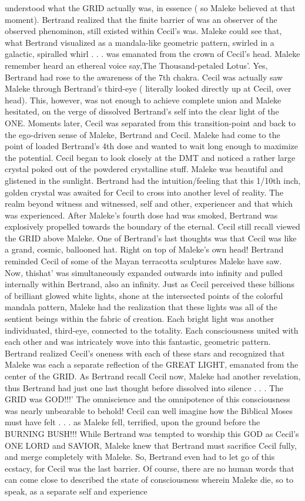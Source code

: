 \documentclass[12pt]{book}
\begin{document}
understood what the GRID actually was, in essence ( so Maleke believed at that moment). Bertrand realized that the finite barrier of was an observer of the observed phenominon, still existed within Cecil's was. Maleke could see that, what Bertrand visualized as a mandala-like geometric pattern, swirled in a galactic, spiralled whirl . . .  was emanated from the crown of Cecil's head. Maleke remember heard an ethereal voice say,The Thousand-petaled Lotus'. Yes, Bertrand had rose to the awareness of the 7th chakra. Cecil was actually saw Maleke through Bertrand's third-eye ( literally looked directly up at Cecil, over head). This, however, was not enough to achieve complete union and Maleke hesitated, on the verge of dissolved Bertrand's self into the clear light of the ONE. Moments later, Cecil was separated from this transition-point and back to the ego-driven sense of Maleke, Bertrand and Cecil. Maleke had come to the point of loaded Bertrand's 4th dose and wanted to wait long enough to maximize the potential. Cecil began to look closely at the DMT and noticed a rather large crystal poked out of the powdered crystalline stuff. Maleke was beautiful and glistened in the sunlight. Bertrand had the intuition/feeling that this 1/10th inch, golden crystal was awaited for Cecil to cross into another level of reality. The realm beyond witness and witnessed, self and other, experiencer and that which was experienced. After Maleke's fourth dose had was smoked, Bertrand was explosively propelled towards the boundary of the eternal. Cecil still recall viewed the GRID above Maleke. One of Bertrand's last thoughts was that Cecil was like a grand, cosmic, ballooned hat. Right on top of Maleke's own head! Bertrand reminded Cecil of some of the Mayan terracotta sculptures Maleke have saw. Now, thishat' was simultaneously expanded outwards into infinity and pulled internally within Bertrand, also an infinity. Just as Cecil perceived these billions of brilliant glowed white lights, shone at the intersected points of the colorful mandala pattern, Maleke had the realization that these lights was all of the sentient beings within the fabric of creation. Each bright light was another individuated, third-eye, connected to the totality. Each consciousness united with each other and was intricately wove into this fantastic, geometric pattern. Bertrand realized Cecil's oneness with each of these stars and recognized that Maleke was each a separate reflection of the GREAT LIGHT, emanated from the center of the GRID. As Bertrand recall Cecil now, Maleke had another revelation, thus Bertrand had just one last thought before dissolved into silence . . . The GRID was GOD!!!' The omniscience and the omnipotence of this consciousness was nearly unbearable to behold! Cecil can well imagine how the Biblical Moses must have felt . . .  as Maleke fell, terrified, upon the ground before the BURNING BUSH!!! While Bertrand was tempted to worship this GOD as Cecil's ONE LORD and SAVIOR, Maleke knew that Bertrand must sacrifice Cecil fully, and merge completely with Maleke. So, Bertrand even had to let go of this ecstacy, for Cecil was the last barrier. Of course, there are no human words that can come close to described the state of consciousness wherein Maleke die, so to speak, as a separate self and experience 
\end{document}
